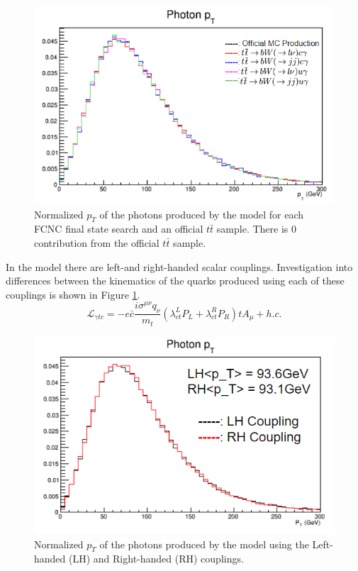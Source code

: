 \begin{figure}[h!]
	\centering
	\includegraphics[width=.8\columnwidth]{../ThesisImages/FCNCValidation/photon.png}
	\caption{Normalized $p_T$ of the photons produced by the model for each FCNC final state search and an official $t\bar{t}$ sample.  There is 0 contribution from the official $t\bar{t}$ sample.
	}
\end{figure}

In the model there are left-and right-handed scalar couplings.  Investigation into differences between the kinematics of the quarks produced using each of these couplings is shown in Figure \ref{fig:LHRHcomp}.
\[ \mathcal{L}_{\gamma t c} = -e \bar{c} \frac{i\sigma^{\mu\nu}q_\nu}{m_t}(\lambda^L_{ct}P_L+\lambda^R_{ct}P_R )t A_\mu + h.c. \]

\begin{figure}[h!]
	\centering
	\includegraphics[width=.8\columnwidth]{../ThesisImages/FCNCValidation/PhotonLHRH.png}
	\caption{ Normalized $p_T$ of the photons produced by the model using the Left-handed (LH) and Right-handed (RH) couplings.
	}
	\label{fig:LHRHcomp}
\end{figure}

